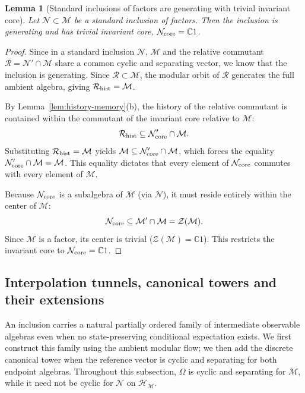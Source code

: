 \documentclass[a4paper,11pt]{article}
\newtheorem{lemma}[theorem]{Lemma}
\theoremstyle{definition}
\newcommand{\mR}{\mathcal{R}}
\newcommand{\mN}{\mathcal{N}}
\newcommand{\mH}{\mathcal{H}}
\newcommand{\mM}{\mathcal{M}}
\begin{document}
\begin{lemma}[Standard inclusions of factors are generating with trivial invariant core]
\label{lem:standard-forgetful}
Let $\mN \subset \mM$ be a standard inclusion of factors. Then the inclusion is generating and has trivial invariant core, $\mN_{\rm core} = \mathbb C1$.
\end{lemma}
\begin{proof}
Since in a standard inclusion $\mN$, $\mM$ and the relative commutant $\mR = \mN' \cap \mM$ share a common cyclic and separating vector, we know that the inclusion is generating. Since $\mR \subset \mM$, the modular orbit of $\mR$ generates the full ambient algebra, giving $\mR_{\rm hist} = \mM$.

By Lemma~\ref{lem:history-memory}(b), the history of the relative commutant is contained within the commutant of the invariant core relative to $\mM$:
\begin{equation}
    \mR_{\rm hist} \subseteq \mN_{\rm core}' \cap \mM.
\end{equation}
Substituting $\mR_{\rm hist} = \mM$ yields $\mM \subseteq \mN_{\rm core}' \cap \mM$, which forces the equality $\mN_{\rm core}' \cap \mM = \mM$. This equality dictates that every element of $\mN_{\rm core}$ commutes with every element of $\mM$.

Because $\mN_{\rm core}$ is a subalgebra of $\mM$ (via $\mN$), it must reside entirely within the center of $\mM$:
\begin{equation}
    \mN_{\rm core} \subseteq \mM' \cap \mM = \mathcal Z(\mM).
\end{equation}
Since $\mM$ is a factor, its center is trivial ($\mathcal Z(\mM) = \mathbb C1$). This restricts the invariant core to $\mN_{\rm core} = \mathbb C1$.
\end{proof}

\subsection{Interpolation tunnels, canonical towers and their extensions}
\label{subsec:interpolation-tunnel}

An inclusion carries a natural partially ordered family of intermediate
observable algebras even when no state-preserving conditional expectation
exists. We first construct this family using the ambient modular flow;
we then add the discrete canonical tower when the reference vector is
cyclic and separating for both endpoint algebras. Throughout this
subsection, $\Omega$ is cyclic and separating for $\mM$, while it need
not be cyclic for $\mN$ on $\mH_{\mM}$.
\end{document}
